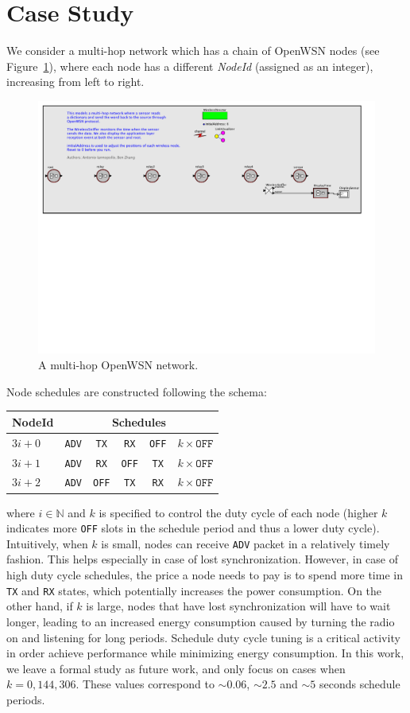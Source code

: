 \section{Case Study}
\label{sec:case-study}

We consider a multi-hop network which has a chain of OpenWSN nodes (see Figure~\ref{fig:multihop}), where each node has a different {\em NodeId} (assigned as an integer), increasing from left to right. 
\begin{figure}[t]
\centering
\includegraphics[width=0.8\columnwidth]{figures/PaperDemoPtolemy}
\caption{\small A multi-hop OpenWSN network.}
\label{fig:multihop}
\end{figure}
Node schedules are constructed following the schema:

\begin{tabular}{ l | c | c | c | c | c }
  \hline                       
  NodeId & \multicolumn{5}{c}{Schedules} \\
  \hline
  $3i+0$ & \texttt{ADV} & \texttt{TX} & \texttt{RX} & \texttt{OFF} & $k \times \texttt{OFF}$ \\
  $3i+1$ & \texttt{ADV} & \texttt{RX} & \texttt{OFF} & \texttt{TX} & $k \times \texttt{OFF}$ \\
  $3i+2$ & \texttt{ADV} & \texttt{OFF} & \texttt{TX} & \texttt{RX} & $k \times \texttt{OFF}$ \\
  \hline  
\end{tabular}
where $i \in \mathbb{N}$ and $k$ is specified to control the duty cycle of each node (higher $k$ indicates more \texttt{OFF} slots in the schedule period and thus a lower duty cycle). Intuitively, when $k$ is small, nodes can receive \texttt{ADV} packet in a relatively timely fashion. This helps especially in case of lost synchronization. However, in case of high duty cycle schedules, the price a node needs to pay is to spend more time in \texttt{TX} and \texttt{RX} states, which potentially increases the power consumption. On the other hand, if $k$ is large, nodes that have lost synchronization will have to wait longer, leading to an increased energy consumption caused by turning the radio on and listening for long periods. Schedule duty cycle tuning is a critical activity in order achieve performance while minimizing energy consumption. In this work, we leave a formal study as future work, and only focus on cases when $k = 0, 144, 306$. These values correspond to $\sim0.06$, $\sim2.5$ and $\sim5$ seconds schedule periods. 


